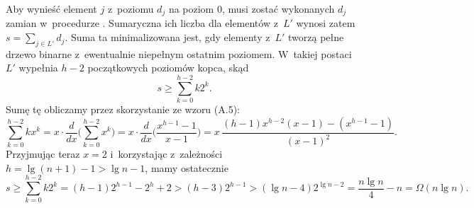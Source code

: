 Aby wynieść element $j$ z~poziomu $d_j$ na poziom 0, musi zostać wykonanych $d_j$ zamian w~procedurze .
Sumaryczna ich liczba dla elementów z~$L'$ wynosi zatem $s=\sum_{j\in L'}d_j$.
Suma ta minimalizowana jest, gdy elementy z~$L'$ tworzą pełne drzewo binarne z~ewentualnie niepełnym ostatnim poziomem.
W~takiej postaci $L'$ wypełnia $h-2$ początkowych poziomów kopca, skąd
\[
	s \ge \sum_{k=0}^{h-2}k2^k.
\]
Sumę tę obliczamy przez skorzystanie ze wzoru (A.5):
\[
    \sum_{k=0}^{h-2}kx^k = x\cdot\frac{d}{dx}\biggl(\sum_{k=0}^{h-2}x^k\biggr) = x\cdot\frac{d}{dx}\biggl(\frac{x^{h-1}-1}{x-1}\biggr) = x\,\frac{(h-1)x^{h-2}(x-1)-(x^{h-1}-1)}{(x-1)^2}.
\]
Przyjmując teraz $x=2$ i~korzystając z~zależności $h=\lg(n+1)-1>\lg n-1$, mamy ostatecznie
\[
    s \ge \sum_{k=0}^{h-2}k2^k = (h-1)2^{h-1}-2^h+2 > (h-3)2^{h-1} > (\lg n-4)2^{\lg n-2} = \frac{n\lg n}{4}-n = \Omega(n\lg n).
\]
